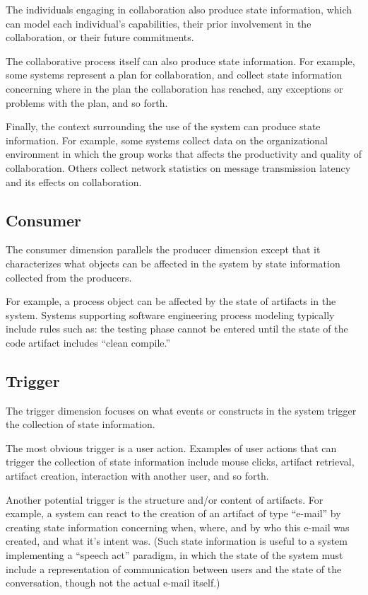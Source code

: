 The individuals engaging in collaboration also produce state information,
which can model each individual's capabilities, their prior involvement in
the collaboration, or their future commitments.


The collaborative process itself can also produce state information.  For
example, some systems represent a plan for collaboration, and collect
state information concerning where in the plan the collaboration has
reached, any exceptions or problems with the plan, and so forth.

Finally, the context surrounding the use of the system can produce state
information. For example, some systems collect data on the organizational
environment in which the group works that affects the productivity and
quality of collaboration. Others collect network
statistics on message transmission latency and its effects on
collaboration.

\subsection{Consumer}

The consumer dimension parallels the producer dimension except
that it characterizes what objects can be affected in the 
system by state information collected from the producers. 

For example, a process object can be affected by the state of artifacts in
the system. Systems supporting software engineering process modeling
typically include rules such as: the testing phase cannot be entered until
the state of the code artifact includes ``clean compile.''


\subsection{Trigger}

The trigger dimension focuses on what events or constructs in the system 
trigger the collection of state information.  

The most obvious trigger is a user action. Examples of user actions
that can trigger the collection of state information include mouse
clicks, artifact retrieval, artifact creation, interaction with another
user, and so forth. 

Another potential trigger is the structure and/or content of artifacts.
For example, a system can react to the creation of an artifact of type
``e-mail'' by creating state information concerning when, where, and by who
this e-mail was created, and what it's intent was. (Such state information
is useful to a system implementing a ``speech act'' paradigm, in
which the state of the system must include a representation of communication
between users and the state of the conversation, though not the actual
e-mail itself.)

